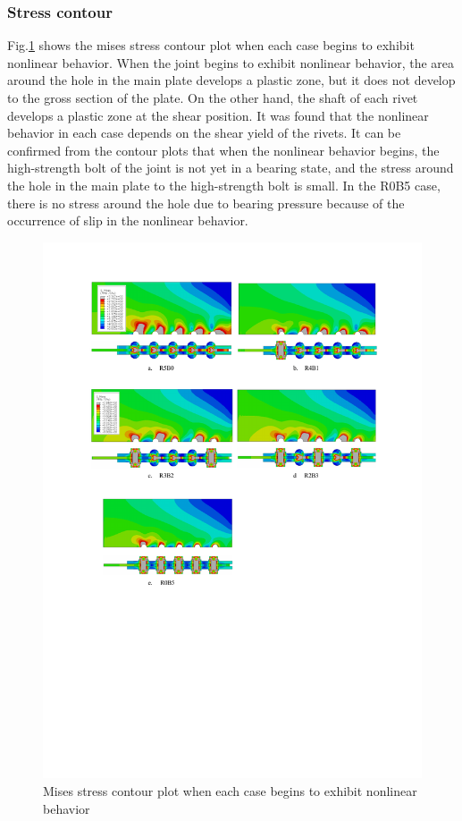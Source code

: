 \subsubsection{Stress contour}

Fig.\ref{fig-5rslscount} shows the mises stress contour plot when each case begins to exhibit nonlinear behavior. When the joint begins to exhibit nonlinear behavior, the area around the hole in the main plate develops a plastic zone, but it does not develop to the gross section of the plate. On the other hand, the shaft of each rivet develops a plastic zone at the shear position. It was found that the nonlinear behavior in each case depends on the shear yield of the rivets. It can be confirmed from the contour plots that when the nonlinear behavior begins, the high-strength bolt of the joint is not yet in a bearing state, and the stress around the hole in the main plate to the high-strength bolt is small. In the R0B5 case, there is no stress around the hole due to bearing pressure because of the occurrence of slip in the nonlinear behavior.

\begin{figure}
    \centering
    \includegraphics[width=1\linewidth]{imgs//ch4/fig-5rslscount.pdf}
    \caption{Mises stress contour plot when each case begins to exhibit nonlinear behavior}
    \label{fig-5rslscount}
\end{figure}

